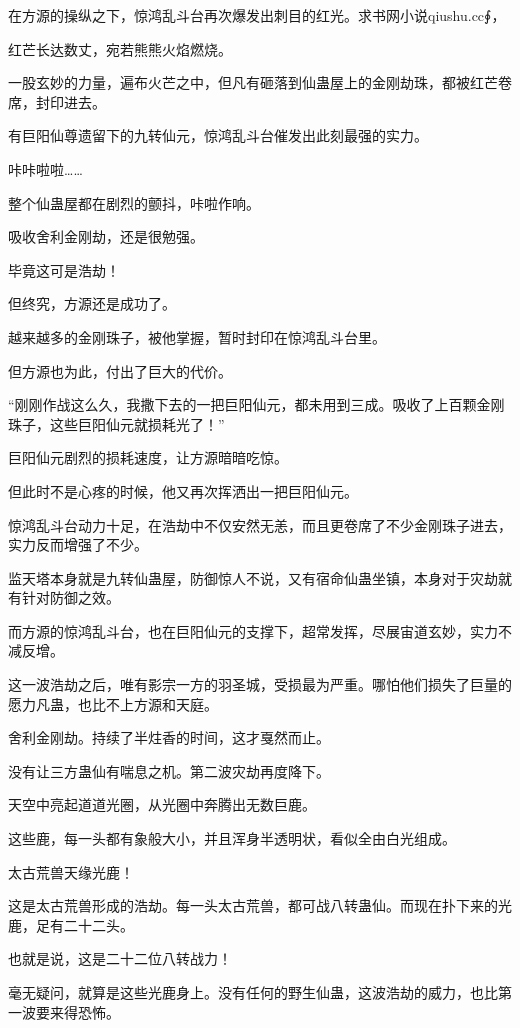 
\begin{this_body}

在方源的操纵之下，惊鸿乱斗台再次爆发出刺目的红光。求书网小说qiushu.cc∮，

红芒长达数丈，宛若熊熊火焰燃烧。

一股玄妙的力量，遍布火芒之中，但凡有砸落到仙蛊屋上的金刚劫珠，都被红芒卷席，封印进去。

有巨阳仙尊遗留下的九转仙元，惊鸿乱斗台催发出此刻最强的实力。

咔咔啦啦……

整个仙蛊屋都在剧烈的颤抖，咔啦作响。

吸收舍利金刚劫，还是很勉强。

毕竟这可是浩劫！

但终究，方源还是成功了。

越来越多的金刚珠子，被他掌握，暂时封印在惊鸿乱斗台里。

但方源也为此，付出了巨大的代价。

“刚刚作战这么久，我撒下去的一把巨阳仙元，都未用到三成。吸收了上百颗金刚珠子，这些巨阳仙元就损耗光了！”

巨阳仙元剧烈的损耗速度，让方源暗暗吃惊。

但此时不是心疼的时候，他又再次挥洒出一把巨阳仙元。

惊鸿乱斗台动力十足，在浩劫中不仅安然无恙，而且更卷席了不少金刚珠子进去，实力反而增强了不少。

监天塔本身就是九转仙蛊屋，防御惊人不说，又有宿命仙蛊坐镇，本身对于灾劫就有针对防御之效。

而方源的惊鸿乱斗台，也在巨阳仙元的支撑下，超常发挥，尽展宙道玄妙，实力不减反增。

这一波浩劫之后，唯有影宗一方的羽圣城，受损最为严重。哪怕他们损失了巨量的愿力凡蛊，也比不上方源和天庭。

舍利金刚劫。持续了半炷香的时间，这才戛然而止。

没有让三方蛊仙有喘息之机。第二波灾劫再度降下。

天空中亮起道道光圈，从光圈中奔腾出无数巨鹿。

这些鹿，每一头都有象般大小，并且浑身半透明状，看似全由白光组成。

太古荒兽天缘光鹿！

这是太古荒兽形成的浩劫。每一头太古荒兽，都可战八转蛊仙。而现在扑下来的光鹿，足有二十二头。

也就是说，这是二十二位八转战力！

毫无疑问，就算是这些光鹿身上。没有任何的野生仙蛊，这波浩劫的威力，也比第一波要来得恐怖。


\end{this_body}
